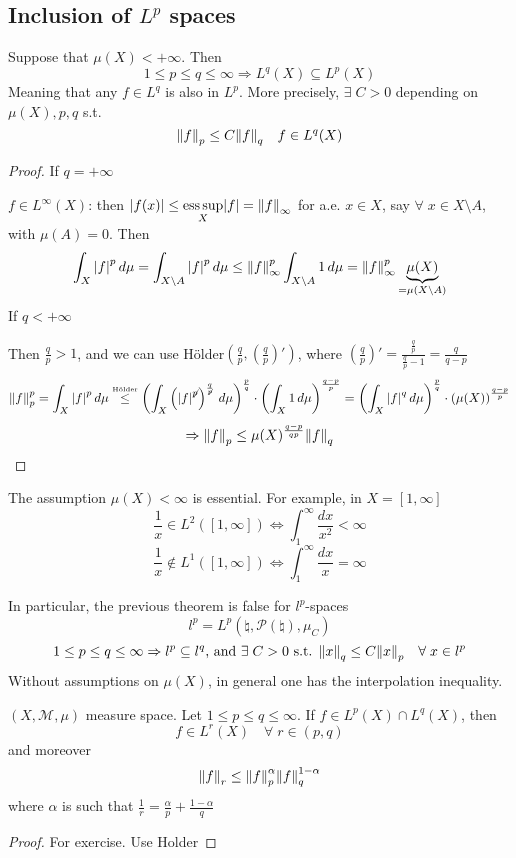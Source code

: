 \subsection*{Inclusion of \(L^p\) spaces}
\begin{theorem}
    Suppose that \(\mu(X) < +\infty\). Then 
    \[
        1 \leq p \leq q \leq \infty \Rightarrow L^q(X) \subseteq L^p(X)
    \]
    Meaning that any \(f \in L^q\) is also in \(L^p\). More precisely, \(\exists \; C > 0\) depending on \(\mu(X), p, q\) s.t.
    \[
        \norm{f}_p \leq C \norm{f}_q \quad f \in L^q(X)
    \]
\end{theorem}
\begin{proof}
    If \(q = +\infty\)
    
    \(f \in L^\infty(X)\): then \(\abs{f(x)} \leq \underset{X}{\text{ess}\, \text{sup}}\abs{f} = \norm{f}_\infty\) for a.e. \(x \in X\), say \(\forall \; x \in X \setminus A\), with \(\mu(A) = 0\). Then 
    \[
        \int_X \abs{f}^p \, d\mu = \int_{X\setminus A} \abs{f}^p \, d\mu \leq \norm{f}_{\infty}^p \int_{X\setminus A} 1 \,d\mu = \norm{f}_\infty^p \underbrace{\mu(X)}_{= \mu(X\setminus A)}
    \]
    If \(q < +\infty\)

    Then \(\frac{q}{p} > 1\), and we can use Hölder\(\left(\frac{q}{p},\left( \frac{q}{p} \right)' \right)\), where \(\left( \frac{q}{p} \right)' = \frac{\frac{q}{p}}{\frac{q}{p}-1} = \frac{q}{q-p}\)
    \[
        \norm{f}_p^p = \int_X \abs{f}^p \, d\mu \overset{\text{\tiny{Hölder}}}{\leq} \left( \int_X \left( \abs{f}^{\not p} \right)^{\frac{q}{\not p}} \, d\mu\right)^{\frac{p}{q}}\cdot \left( \int_X 1 \, d\mu \right)^{\frac{q-p}{p}} = \left( \int_X \abs{f}^{q} \, d\mu\right)^{\frac{p}{q}}\cdot \left( \mu(X)\right)^{\frac{q-p}{p}}
    \]
    \[
        \Rightarrow \norm{f}_p \leq \mu(X)^{\frac{q-p}{qp}} \norm{f}_q
    \]
\end{proof}

The assumption \(\mu(X)< \infty\) is essential. For example, in \(X = [1, \infty]\)
\[
    \frac{1}{x} \in L^2([1, \infty]) \Leftrightarrow \int_1^\infty \frac{dx}{x^2} < \infty
\]
\[
    \frac{1}{x} \notin L^1 ([1, \infty]) \Leftrightarrow \int_1^\infty \frac{dx}{x} = \infty
\]

In particular, the previous theorem is false for \(l^p\)-spaces
\[
    l^p = L^p(\natural, \mathcal{P}(\natural), \mu_C)
\]
\[
    1 \leq p \leq q \leq \infty \Rightarrow l^p \subseteq l^q \text{, and } \exists \; C>0 \text{ s.t. } \norm{x}_q \leq C \norm{x}_p \quad \forall\; x \in l^p
\]
Without assumptions on \(\mu(X)\), in general one has the interpolation inequality.
\begin{theorem}
    \((X, \mathcal{M}, \mu)\) measure space. 
    Let \(1 \leq p \leq q \leq \infty\). If \(f \in L^p(X) \cap L^q(X)\), then 
    \[
        f \in L^r(X) \quad \forall \; r \in (p, q)
    \]
    and moreover 
    \[
        \norm{f}_r \leq \norm{f}_p^\alpha \norm{f}_q^{1-\alpha}
    \]
    where \(\alpha\) is such that \(\frac{1}{r}=\frac{\alpha}{p} + \frac{1-\alpha}{q}\)
\end{theorem}
\begin{proof}
    For exercise. Use Holder
\end{proof}

